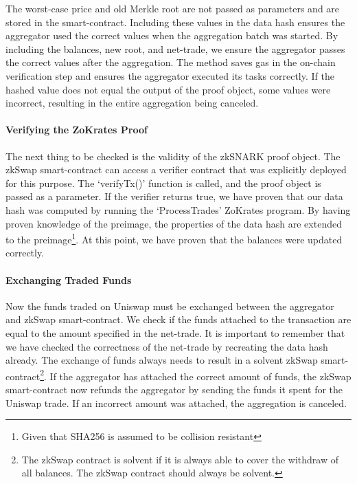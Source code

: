 \documentclass[../../thesis.tex]{subfiles}
\begin{document}
The worst-case price and old Merkle root are not passed as parameters and are stored in the smart-contract. Including these values in the data hash ensures the aggregator used the correct values when the aggregation batch was started. By including the balances, new root, and net-trade, we ensure the aggregator passes the correct values after the aggregation. The method saves gas in the on-chain verification step and ensures the aggregator executed its tasks correctly. If the hashed value does not equal the output of the proof object, some values were incorrect, resulting in the entire aggregation being canceled. 

\paragraph{Verifying the ZoKrates Proof}
The next thing to be checked is the validity of the zkSNARK proof object. The zkSwap smart-contract can access a verifier contract that was explicitly deployed for this purpose. The `verifyTx()' function is called, and the proof object is passed as a parameter. If the verifier returns true, we have proven that our data hash was computed by running the `ProcessTrades' ZoKrates program. By having proven knowledge of the preimage, the properties of the data hash are extended to the preimage\footnote{Given that SHA256 is assumed to be collision resistant}. At this point, we have proven that the balances were updated correctly.

\paragraph{Exchanging Traded Funds}
Now the funds traded on Uniswap must be exchanged between the aggregator and zkSwap smart-contract. We check if the funds attached to the transaction are equal to the amount specified in the net-trade. It is important to remember that we have checked the correctness of the net-trade by recreating the data hash already. The exchange of funds always needs to result in a solvent zkSwap smart-contract\footnote{The zkSwap contract is solvent if it is always able to cover the withdraw of all balances. The zkSwap contract should always be solvent.}. If the aggregator has attached the correct amount of funds, the zkSwap smart-contract now refunds the aggregator by sending the funds it spent for the Uniswap trade. If an incorrect amount was attached, the aggregation is canceled.
\end{document}
